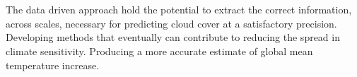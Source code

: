 \\ \\
The data driven approach hold the potential to extract the correct information, across scales, necessary for predicting cloud cover at a satisfactory precision. Developing methods that eventually can contribute to reducing the spread in climate sensitivity. Producing a more accurate estimate of global mean temperature increase.
